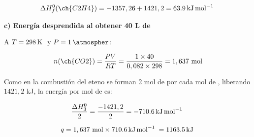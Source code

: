 \begin{exerciseEVAU}
\begin{solu}
        \begin{equation*}
            \Delta H^0_f (\ch{C2H4}) = -1357,26 + 1421,2 = \energia[kjmol]{63.9}
        \end{equation*}

        \textbf{c) Energía desprendida al obtener 40 L de }

        A \(T = \temperatura[k]{298}\) y \(P = \SI{1}{\atmospher}\):

        \begin{equation*}
            n(\ch{CO2}) = \dfrac{PV}{RT} = \dfrac{1 \times 40}{0,082 \times 298} = 1,637 \ \text{mol}
        \end{equation*}

        Como en la combustión del eteno se forman 2 mol de  por cada mol de , liberando \(1421,2\) kJ, la energía por mol de  es:

        \begin{equation*}
            \dfrac{\Delta H^0_3}{2} = \dfrac{-1421,2}{2} = \energia[kjmol]{-710.6}
        \end{equation*}

        \begin{equation*}
            q = 1,637 \ \text{mol} \times \energia[kjmol]{710.6} = \energia[kj]{1163.5}
        \end{equation*}

    \end{solu}
\end{exerciseEVAU}

